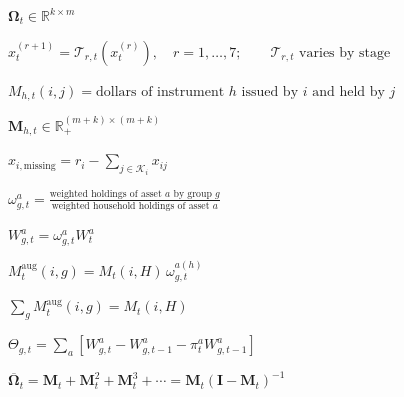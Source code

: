 \documentclass[12pt]{article}
\newenvironment{slidemath}
  {\begin{preview}\color{mssnavy}\(\displaystyle}
  {\)\end{preview}}
\begin{document}
\begin{slidemath}
\boldsymbol\Omega_t\in\mathbb R^{k\times m}
\end{slidemath}

\begin{slidemath}
x_t^{(r+1)}=\mathcal T_{r,t}\!\left(x_t^{(r)}\right),
\quad r=1,\ldots,7;
\qquad \mathcal T_{r,t}\text{ varies by stage}
\end{slidemath}

\begin{slidemath}
M_{h,t}(i,j)
=\text{dollars of instrument }h\text{ issued by }i\text{ and held by }j
\end{slidemath}

\begin{slidemath}
\mathbf M_{h,t}\in\mathbb R_{+}^{(m+k)\times(m+k)}
\end{slidemath}

\begin{slidemath}
x_{i,\mathrm{missing}}
=r_i-\sum_{j\in\mathcal K_i}x_{ij}
\end{slidemath}

\begin{slidemath}
\omega_{g,t}^{a}
=
\frac{\text{weighted holdings of asset }a\text{ by group }g}
     {\text{weighted household holdings of asset }a}
\end{slidemath}

\begin{slidemath}
W_{g,t}^{a}=\omega_{g,t}^{a}W_t^{a}
\end{slidemath}

\begin{slidemath}
M_t^{\mathrm{aug}}(i,g)
=M_t(i,H)\,\omega_{g,t}^{a(h)}
\end{slidemath}

\begin{slidemath}
\sum_g M_t^{\mathrm{aug}}(i,g)=M_t(i,H)
\end{slidemath}

\begin{slidemath}
\Theta_{g,t}
=\sum_a\left[
W_{g,t}^{a}-W_{g,t-1}^{a}-\pi_t^{a}W_{g,t-1}^{a}
\right]
\end{slidemath}

\begin{slidemath}
\overline{\boldsymbol\Omega}_t
=\mathbf M_t+\mathbf M_t^2+\mathbf M_t^3+\cdots
=\mathbf M_t(\mathbf I-\mathbf M_t)^{-1}
\end{slidemath}
\end{document}
